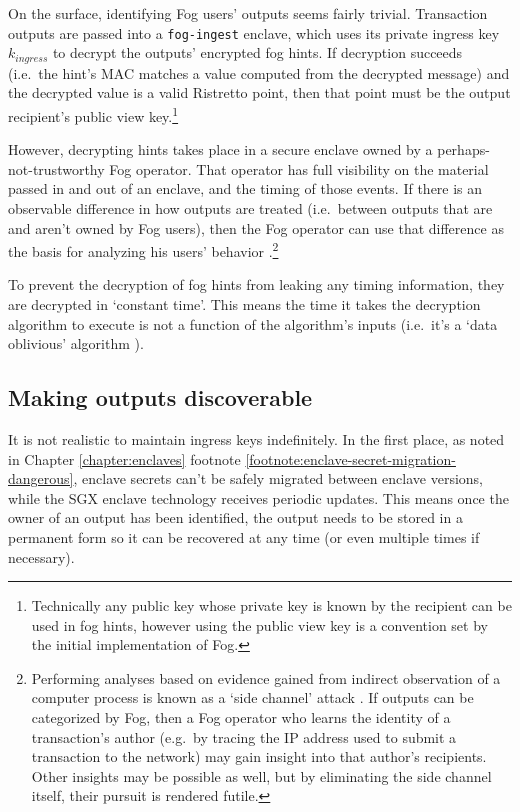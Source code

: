 On the surface, identifying Fog users' outputs seems fairly trivial. Transaction outputs are passed into a {\tt fog-ingest} enclave, which uses its private ingress key $k_{ingress}$ to decrypt the outputs' encrypted fog hints. If decryption succeeds (i.e.\ the hint's MAC matches a value computed from the decrypted message) and the decrypted value is a valid Ristretto point, then that point must be the output recipient's public view key.\footnote{Technically any public key whose private key is known by the recipient can be used in fog hints, however using the public view key is a convention set by the initial implementation of Fog.}

However, decrypting hints takes place in a secure enclave owned by a perhaps-not-trustworthy Fog operator. That operator has full visibility on the material passed in and out of an enclave, and the timing of those events. If there is an observable difference in how outputs are treated (i.e.\ between outputs that are and aren't owned by Fog users), then the Fog operator can use that difference as the basis for analyzing his users' behavior \cite{privacy-properties-mobilecoin-fog}.\footnote{Performing analyses based on evidence gained from indirect observation of a computer process is known as a `side channel' attack \cite{nist-side-channel-attack-def}. If outputs can be categorized by Fog, then a Fog operator who learns the identity of a transaction's author (e.g.\ by tracing the IP address used to submit a transaction to the network) may gain insight into that author's recipients. Other insights may be possible as well, but by eliminating the side channel itself, their pursuit is rendered futile.}

To prevent the decryption of fog hints from leaking any timing information, they are decrypted in `constant time'. This means the time it takes the decryption algorithm to execute is not a function of the algorithm's inputs (i.e.\ it's a `data oblivious' algorithm \cite{data-oblivious-data-structures}).


\subsection{Making outputs discoverable}
\label{subsec:fog-making-outputs-discoverable}

It is not realistic to maintain ingress keys indefinitely. In the first place, as noted in Chapter \ref{chapter:enclaves} footnote \ref{footnote:enclave-secret-migration-dangerous}, enclave secrets can't be safely migrated between enclave versions, while the SGX enclave technology receives periodic updates. This means once the owner of an output has been identified, the output needs to be stored in a permanent form so it can be recovered at any time (or even multiple times if necessary).


